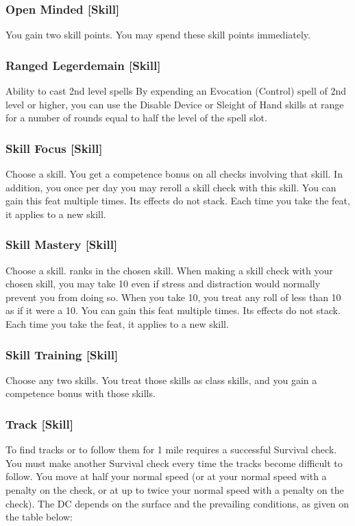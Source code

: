 \subsubsection{Open Minded [Skill]}
 You gain two skill points. You may spend these skill points immediately.

\subsubsection{Ranged Legerdemain [Skill]}
 Ability to cast 2nd level spells
 By expending an Evocation (Control) spell of 2nd level or higher, you can use the Disable Device or Sleight of Hand skills at \rngclose range for a number of rounds equal to half the level of the spell slot.

\subsubsection{Skill Focus [Skill]}
Choose a skill.
 You get a  competence bonus on all checks involving that skill. In addition, you once per day you may reroll a skill check with this skill.
 You can gain this feat multiple times. Its effects do not stack. Each time you take the feat, it applies to a new skill.

\subsubsection{Skill Mastery [Skill]}
Choose a skill.
 ranks in the chosen skill.
\featben When making a skill check with your chosen skill, you may take 10 even if stress and distraction would normally prevent you from doing so. When you take 10, you treat any roll of less than 10 as if it were a 10.
 You can gain this feat multiple times. Its effects do not stack. Each time you take the feat, it applies to a new skill.

\subsubsection{Skill Training [Skill]}
\featben Choose any two skills. You treat those skills as class skills, and you gain a  competence bonus with those skills.

\subsubsection{Track [Skill]}
 To find tracks or to follow them for 1 mile requires a successful Survival check. You must make another Survival check every time the tracks become difficult to follow.
You move at half your normal speed (or at your normal speed with a  penalty on the check, or at up to twice your normal speed with a  penalty on the check). The DC depends on the surface and the prevailing conditions, as given on the table below:

